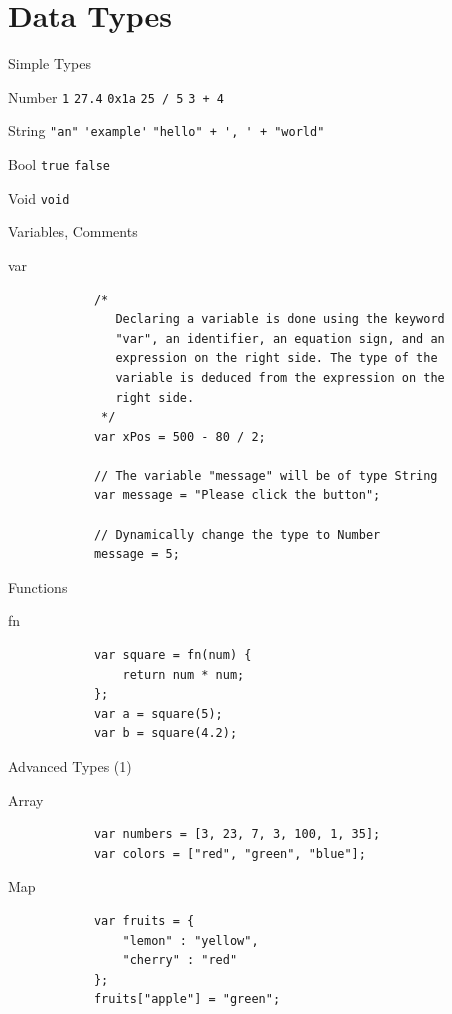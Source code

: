 \documentclass[ucs,9pt]{beamer}
\begin{document}
\section{Data Types}
\begin{frame}[fragile]{Simple Types}
	\begin{block}{Number}
		\hfill \lstinline!1! \hfill \lstinline!27.4! \hfill \lstinline!0x1a! \hfill \lstinline!25 / 5! \hfill \lstinline!3 + 4! \hfill{}
	\end{block}
	\begin{block}{String}
		\hfill \lstinline!"an"! \hfill \lstinline!'example'! \hfill \lstinline!"hello" + ', ' + "world"! \hfill{}
	\end{block}
	\begin{block}{Bool}
		\hfill \lstinline!true! \hfill \lstinline!false! \hfill{}
	\end{block}
	\begin{block}{Void}
		\hfill \lstinline!void! \hfill{}
	\end{block}
\end{frame}

\begin{frame}[fragile]{Variables, Comments}
	\begin{block}{var}
		\begin{lstlisting}
			/*
			   Declaring a variable is done using the keyword
			   "var", an identifier, an equation sign, and an
			   expression on the right side. The type of the
			   variable is deduced from the expression on the
			   right side.
			 */
			var xPos = 500 - 80 / 2;

			// The variable "message" will be of type String
			var message = "Please click the button";

			// Dynamically change the type to Number
			message = 5;
		\end{lstlisting}
	\end{block}
\end{frame}

\begin{frame}[fragile]{Functions}
	\begin{block}{fn}
		\begin{lstlisting}
			var square = fn(num) {
			    return num * num;
			};
			var a = square(5);
			var b = square(4.2);
		\end{lstlisting}
	\end{block}
\end{frame}

\begin{frame}[fragile]{Advanced Types (1)}
	\begin{block}{Array}
		\begin{lstlisting}
			var numbers = [3, 23, 7, 3, 100, 1, 35];
			var colors = ["red", "green", "blue"];
		\end{lstlisting}
	\end{block}
	\begin{block}{Map}
		\begin{lstlisting}
			var fruits = {
			    "lemon" : "yellow",
			    "cherry" : "red"
			};
			fruits["apple"] = "green";
		\end{lstlisting}
	\end{block}
\end{frame}
\end{document}
